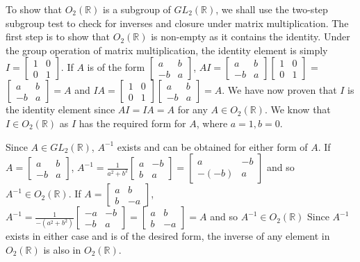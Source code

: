 \documentclass[12pt,letterpaper,reqno]{amsart}
\newcommand{\R}{\mathbb R}
\begin{document}
\begin{enumerate}
\begin{flushleft}
To show that $O_2(\R)$ is a subgroup of $GL_2(\R)$, we shall use the two-step subgroup test to check for inverses and closure under matrix multiplication. The first step is to show that $O_2(\R)$ is non-empty as it contains the identity. Under the group operation of matrix multiplication, the identity element is simply $I = \begin{bmatrix} 1 & 0 \\0 & 1 \end{bmatrix}$. If $A$ is of the form $\begin{bmatrix} a & b \\-b & a \end{bmatrix}$, $AI = \begin{bmatrix} a & b \\-b & a \end{bmatrix}\begin{bmatrix} 1 & 0 \\0 & 1 \end{bmatrix}$ = $\begin{bmatrix} a & b \\-b & a \end{bmatrix} = A$ and $IA = \begin{bmatrix} 1 & 0 \\0 & 1 \end{bmatrix}\begin{bmatrix} a & b \\-b & a \end{bmatrix} = A$. We have now proven that $I$ is the identity element since $AI = IA = A$ for any $A \in O_2(\R)$. We know that $I \in O_2(\R)$ as $I$ has the required form for $A$, where $a = 1, b = 0$.
\newline

Since $A \in GL_2(\R)$, $A^{-1}$ exists and can be obtained for either form of $A$. If $A = \begin{bmatrix} a & b \\-b & a \end{bmatrix}$, $A^{-1} = \frac{1}{a^2 + b^2}\begin{bmatrix} a & -b \\b & a \end{bmatrix} = \begin{bmatrix} a & -b \\-(-b) & a \end{bmatrix}$ and so $A^{-1} \in O_2(\R)$. If $A = \begin{bmatrix} a & b \\b & -a \end{bmatrix}$, $A^{-1} = \frac{1}{-(a^2 + b^2)}\begin{bmatrix} -a & -b \\-b & a \end{bmatrix} = \begin{bmatrix} a & b \\b & -a \end{bmatrix} = A$ and so $A^{-1} \in O_2(\R)$ Since $A^{-1}$ exists in either case and is of the desired form, the inverse of any element in $O_2(\R)$ is also in $O_2(\R)$.
\newline


\end{flushleft}
\end{enumerate}
\end{document}
